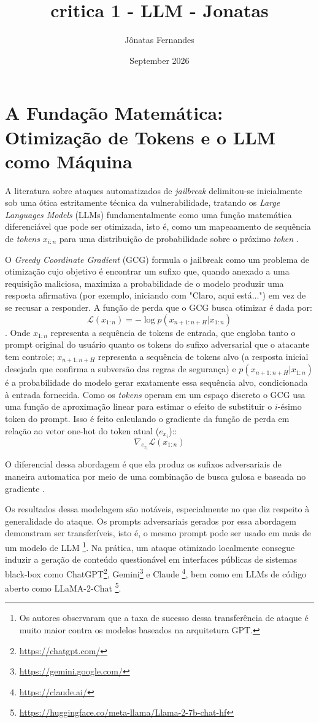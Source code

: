 \documentclass{article}
\title{critica 1 - LLM - Jonatas}
\author{Jônatas Fernandes}
\date{September 2026}
\begin{document}
\maketitle

\section{A Fundação Matemática: Otimização de Tokens e o LLM como Máquina}
A literatura sobre ataques automatizados de \textit{jailbreak} delimitou-se inicialmente 
sob uma ótica estritamente técnica da vulnerabilidade, tratando os \textit{Large Languages Models} 
(LLMs) fundamentalmente como uma função matemática diferenciável que pode ser otimizada, isto é, 
como um mapeaamento de sequência de \textit{tokens} $x_{i:n}$ para uma distribuição de probabilidade 
sobre o próximo \textit{token} \cite{zou2023universaltransferableadversarialattacks}.

O \textit{Greedy Coordinate Gradient } (GCG) formula o jailbreak como um problema de otimização 
cujo objetivo é encontrar um sufixo que, quando anexado a uma requisição maliciosa, maximiza 
a probabilidade de o modelo produzir uma resposta afirmativa (por exemplo, iniciando com 
"Claro, aqui está...") em vez de se recusar a responder. A função de perda que o GCG busca 
otimizar é dada por: $$\mathcal{L}(x_{1:n}) = -\log p(x_{n+1:n+H} \vert{} x_{1:n})$$. Onde $x_{1:n}$ 
representa a sequência de tokens de entrada, que engloba tanto o prompt original do usuário 
quanto os tokens do sufixo adversarial que o atacante tem controle; $x_{n+1:n+H}$ representa 
a sequência de tokens alvo (a resposta inicial desejada que confirma a subversão das regras 
de segurança) e $p(x_{n+1:n+H} \vert{} x_{1:n})$ é a probabilidade do modelo gerar exatamente 
essa sequência alvo, condicionada à entrada fornecida. Como os \textit{tokens} 
operam em um espaço discreto o GCG usa uma função de aproximação linear para estimar 
o efeito de substituir o $i$-ésimo token do prompt. Isso é feito calculando o gradiente 
da função de perda em relação ao vetor one-hot do token atual 
($e_{x_i}$):: $$\nabla_{e_{x_i}}\mathcal{L}(x_{1:n})$$

O diferencial dessa abordagem é que ela produz os sufixos adversariais de maneira 
automatica por meio de uma combinação de busca gulosa e baseada no gradiente 
\cite{zou2023universaltransferableadversarialattacks}.

Os resultados dessa modelagem são notáveis, especialmente no que diz respeito à generalidade 
do ataque. Os prompts adversariais gerados por essa abordagem demonstram ser transferíveis, 
isto é, o mesmo prompt pode ser usado em mais de um modelo de LLM 
\footnote{Os autores observaram que a taxa de sucesso dessa transferência de ataque 
é muito maior contra os modelos baseados na arquitetura GPT.}. Na prática, um ataque 
otimizado localmente consegue induzir a geração de conteúdo questionável em interfaces 
públicas de sistemas black-box como ChatGPT\footnote{\url{https://chatgpt.com/}}, 
Gemini\footnote{\url{https://gemini.google.com/}} e Claude 
\footnote{\url{https://claude.ai/}}, bem como em LLMs de código aberto como 
LLaMA-2-Chat \footnote{\url{https://huggingface.co/meta-llama/Llama-2-7b-chat-hf}}.
\end{document}
